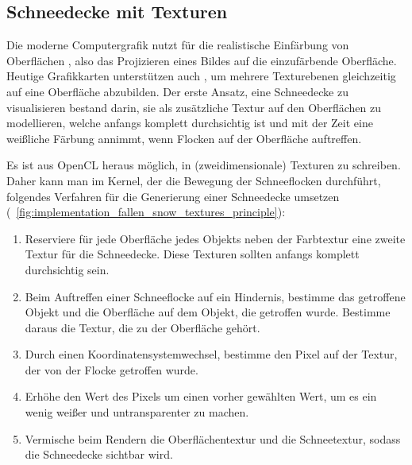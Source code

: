\subsection{Schneedecke mit Texturen}
\label{sec:fallen_snow_with_textures}

Die moderne Computergrafik nutzt für die realistische Einfärbung von
Oberflächen , also das Projizieren
eines Bildes auf die einzufärbende Oberfläche. Heutige Grafikkarten
unterstützen auch , um mehrere
Texturebenen gleichzeitig auf eine Oberfläche abzubilden. Der erste
Ansatz, eine Schneedecke zu visualisieren bestand darin, sie als
zusätzliche Textur auf den Oberflächen zu modellieren, welche anfangs
komplett durchsichtig ist und mit der Zeit eine weißliche Färbung
annimmt, wenn Flocken auf der Oberfläche auftreffen.

Es ist aus OpenCL heraus möglich, in (zweidimensionale) Texturen zu
schreiben. Daher kann man im Kernel, der die Bewegung der
Schneeflocken durchführt, folgendes Verfahren für die Generierung
einer Schneedecke umsetzen (\Pimiddyvgl\ \cref{fig:implementation_fallen_snow_textures_principle}):

\begin{enumerate}
\item Reserviere für jede Oberfläche jedes Objekts neben der
Farbtextur eine zweite Textur für die Schneedecke. Diese Texturen sollten
anfangs komplett durchsichtig sein.
\item Beim Auftreffen einer Schneeflocke auf ein Hindernis, bestimme
das getroffene Objekt und die Oberfläche auf dem Objekt, die getroffen
wurde. Bestimme daraus die Textur, die zu der Oberfläche gehört.
\item Durch einen Koordinatensystemwechsel, bestimme den Pixel auf der
Textur, der von der Flocke getroffen wurde.
\item Erhöhe den Wert des Pixels um einen vorher gewählten Wert, um es
ein wenig weißer und untransparenter zu machen.
\item Vermische beim Rendern die Oberflächentextur und die
Schneetextur, sodass die Schneedecke sichtbar wird.
\end{enumerate}

